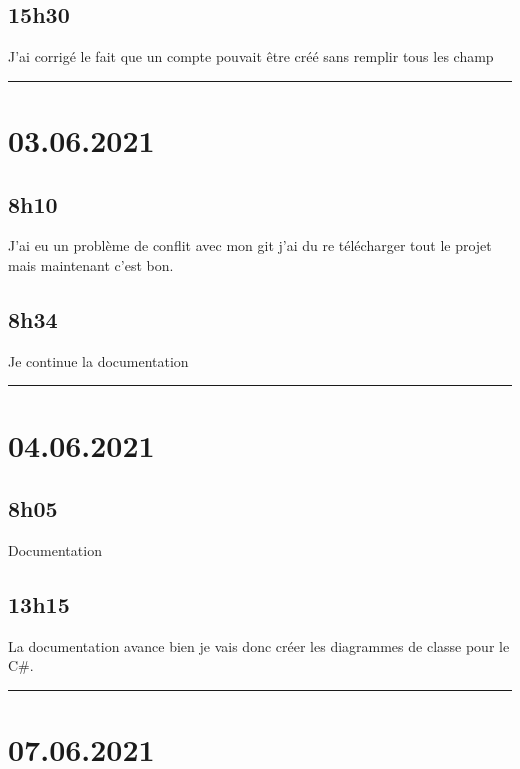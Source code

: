 \documentclass[a4paper,12pt,french]{sphinxmanual}
\begin{document}
\subsection{15h30}
\label{\detokenize{logbook:id185}}
\sphinxAtStartPar
J’ai corrigé le fait que un compte pouvait être créé sans remplir tous les champ


\bigskip\hrule\bigskip



\section{03.06.2021}
\label{\detokenize{logbook:id186}}

\subsection{8h10}
\label{\detokenize{logbook:id187}}
\sphinxAtStartPar
J’ai eu un problème de conflit avec mon git j’ai du re télécharger tout le projet mais maintenant c’est bon.


\subsection{8h34}
\label{\detokenize{logbook:h34}}
\sphinxAtStartPar
Je continue la documentation


\bigskip\hrule\bigskip



\section{04.06.2021}
\label{\detokenize{logbook:id188}}

\subsection{8h05}
\label{\detokenize{logbook:id189}}
\sphinxAtStartPar
Documentation


\subsection{13h15}
\label{\detokenize{logbook:id190}}
\sphinxAtStartPar
La documentation avance bien je vais donc créer les diagrammes de classe pour le C\#.


\bigskip\hrule\bigskip



\section{07.06.2021}
\label{\detokenize{logbook:id191}}
\end{document}
